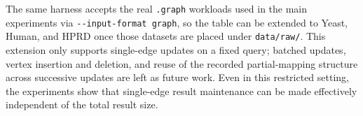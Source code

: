 The same harness accepts the real \texttt{.graph} workloads used in the main experiments via \texttt{-{-}input-format graph}, so the table can be extended to Yeast, Human, and HPRD once those datasets are placed under \texttt{data/raw/}. This extension only supports single-edge updates on a fixed query; batched updates, vertex insertion and deletion, and reuse of the recorded partial-mapping structure across successive updates are left as future work. Even in this restricted setting, the experiments show that single-edge result maintenance can be made effectively independent of the total result size.
